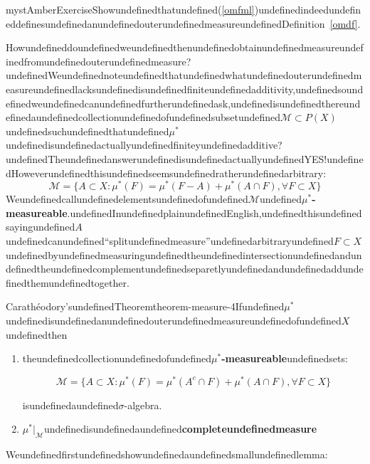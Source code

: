 \begin{mystadmonition}{mystAmber}{Exercise}Showundefinedthatundefined(\ref{omfml})undefinedindeedundefineddefinesundefinedanundefinedouterundefinedmeasureundefinedDefinition~\ref{omdf}.

\end{mystadmonition}
Howundefineddoundefinedweundefinedthenundefinedobtainundefinedmeasureundefinedfromundefinedouterundefinedmeasure?undefinedWeundefinednoteundefinedthatundefinedwhatundefinedouterundefinedmeasureundefinedlacksundefinedisundefinedfiniteundefinedadditivity,undefinedsoundefinedweundefinedcanundefinedfurtherundefinedask,undefinedisundefinedthereundefinedaundefinedcollectionundefinedofundefinedsubsetundefined$\mathcal {M}\subset P(X)$undefinedsuchundefinedthatundefined$\mu^*$undefinedisundefinedactuallyundefinedfiniteyundefinedadditive?undefinedTheundefinedanswerundefinedisundefinedactuallyundefinedYES!undefinedHoweverundefinedthisundefinedseemsundefinedratherundefinedarbitrary:
\begin{equation}
\mathcal M = \{A\subset X: \mu^*(F)=\mu^*(F-A)+\mu^*(A\cap F), \forall F \subset X\}
\end{equation}
Weundefinedcallundefinedelementsundefinedofundefined$\mathcal M$undefined\textbf{$\mu^*$-measureable}.undefinedInundefinedplainundefinedEnglish,undefinedthisundefinedsayingundefined$A$undefinedcanundefined``splitundefinedmeasure''undefinedarbitraryundefined$F\subset X$undefinedbyundefinedmeasuringundefinedtheundefinedintersectionundefinedandundefinedtheundefinedcomplementundefinedseparetlyundefinedandundefinedaddundefinedthemundefinedtogether.

\begin{mystthmtheorem}{Carathéodory'sundefinedTheorem}{theorem-measure-4}Ifundefined$\mu^*$undefinedisundefinedanundefinedouterundefinedmeasureundefinedofundefined$X$undefinedthen

\begin{enumerate}
\item theundefinedcollectionundefinedofundefined\textbf{$\mu^*$-measureable}undefinedsets:

\begin{equation}
\mathcal M = \{A\subset X: \mu^*(F)=\mu^*(A^c \cap F)+\mu^*(A\cap F), \forall F \subset X\}
\end{equation}


isundefinedaundefined$\sigma$-algebra.


\item $\mu^*|_{\mathcal M}$undefinedisundefinedaundefined\textbf{completeundefinedmeasure}
\end{enumerate}

\end{mystthmtheorem}
Weundefinedfirstundefinedshowundefinedaundefinedsmallundefinedlemma:

